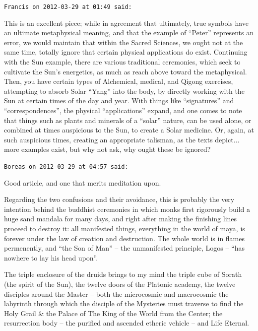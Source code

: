 \begin{footnotesize}
\begin{sffamily}
\texttt{Francis on 2012-03-29 at 01:49 said:}

This is an excellent piece; while in agreement that ultimately, true symbols have an ultimate metaphysical meaning, and that the example of ``Peter'' represents an error, we would maintain that within the Sacred Sciences, we ought not at the same time, totally ignore that certain physical applications do exist. Continuing with the Sun example, there are various traditional ceremonies, which seek to cultivate the Sun's energetics, as much as reach above toward the metaphysical. Then, you have certain types of Alchemical, medical, and Qigong exercises, attempting to absorb Solar ``Yang'' into the body, by directly working with the Sun at certain times of the day and year. With things like ``signatures'' and ``correspondences'', the physical ``applications'' expand, and one comes to note that things such as plants and minerals of a ``solar'' nature, can be used alone, or combined at times auspicious to the Sun, to create a Solar medicine. Or, again, at such auspicious times, creating an appropriate talisman, as the texts depict... more examples exist, but why not ask, why ought these be ignored?

\hfill

\texttt{Boreas on 2012-03-29 at 04:57 said:}

Good article, and one that merits meditation upon.

Regarding the two confusions and their avoidance, this is probably the very intention behind the buddhist ceremonies in which monks first rigorously build a huge sand mandala for many days, and right after making the finishing lines proceed to destroy it: all manifested things, everything in the world of maya, is forever under the law of creation and destruction. The whole world is in flames permenently, and ``the Son of Man'' -- the unmanifested principle, Logos -- ``has nowhere to lay his head upon''.

The triple enclosure of the druids brings to my mind the triple cube of Sorath (the spirit of the Sun), the twelve doors of the Platonic academy, the twelve disciples around the Master -- both the microcosmic and macrocosmic the labyrinth through which the disciple of the Mysteries must traverse to find the Holy Grail \& the Palace of The King of the World from the Center; the resurrection body -- the purified and ascended etheric vehicle -- and Life Eternal.


\end{sffamily}
\end{footnotesize}
